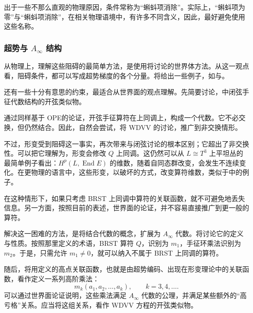 出于一些不那么直观的物理原因，条件常称为“蝌蚪项消除”。实际上，“蝌蚪项为零”与“蝌蚪项消除”，在相关物理语境中，有许多不同含义，因此，最好避免使用这些名称。

\subsubsection{超势与 \texorpdfstring{$A_\infty$}{A∞} 结构}\label{sec:3.6.2.4}

从物理上，理解这些阻碍的最简单方法，是使用将讨论的世界体方法。从这一观点看，阻碍条件，都可以写成超势梯度的各个分量。将给出一些例子，如与。

还有一些十分有意思的约束，最适合从世界面的观点理解。先简要讨论，中闭弦手征代数结构的开弦类似物。

通过同样基于 OPE的论证，开弦手征算符在上同调上，构成一个代数。它不必交换，但仍然结合。因此，自然会尝试，将 WDVV 的讨论，推广到非交换情形。

不过，形变受到阻碍这一事实，再次带来与闭弦讨论的根本区别；它超出了非交换性。可以把它理解为，形变会修改 $Q$ 上同调。这仍然可以从 $L\cong T^3$ 上平坦丛的最简单例子看出：$H^p(L,\operatorname{End}E)$ 的维数，随着自同态群改变，会发生不连续变化。在更物理的语言中，这些形变，以破坏的方式，改变算符维数，类似于中的例子。

在这种情形下，如果只考虑 BRST 上同调中算符的关联函数，就不可避免地丢失信息。另一方面，按照目前的表述，世界面的论证，并不容易直接推广到更一般的算符。

解决这一困难的方法，是将结合代数的概念，扩展为 $A_\infty$ 代数。将讨论它的定义与性质。按照那里定义的术语，BRST 算符 $Q$，识别为 $m_1$，手征环乘法识别为 $m_2$。于是，只需允许 $m_1\ne0$，就可以纳入不属于 BRST 上同调的算符。

随后，将用定义的高点关联函数，也就是由超势编码、出现在形变理论中的关联函数，看作定义一系列高阶乘法：
\begin{equation}\label{eq:3.182}
m_k(a_1,a_2,\ldots,a_k),\qquad k=3,4,\ldots.
\end{equation}
可以通过世界面论证说明，这些乘法满足 $A_\infty$ 代数的公理，并满足某些额外的“高亏格”关系。应当将这组关系，看作 WDVV 方程的开弦类似物。

